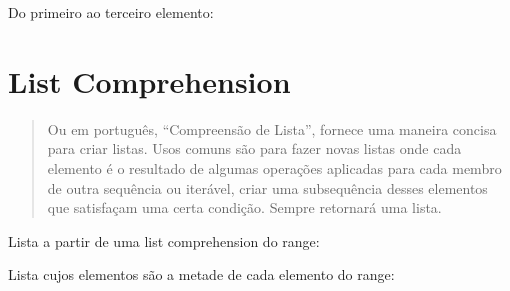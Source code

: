 \documentclass[letterpaper,10pt,brazil]{sphinxmanual}
\begin{document}
Do primeiro ao terceiro elemento:

\begin{sphinxVerbatim}[commandchars=\\\{\}]
\PYG{p}{[}\PYG{p}{]}
\end{sphinxVerbatim}

\begin{sphinxVerbatim}[commandchars=\\\{\}]
\end{sphinxVerbatim}


\section{List Comprehension}
\label{\detokenize{content/sequences:list-comprehension}}\begin{quote}

Ou em português, “Compreensão de Lista”, fornece uma maneira concisa para criar listas.
Usos comuns são para fazer novas listas onde cada elemento é o resultado de algumas operações aplicadas para cada membro de outra sequência ou iterável, criar uma subsequência desses elementos que satisfaçam uma certa condição.
Sempre retornará uma lista.
\end{quote}

Lista a partir de uma list comprehension do range:

\begin{sphinxVerbatim}[commandchars=\\\{\}]
\PYG{p}{[}    \PYG{p}{]}
\end{sphinxVerbatim}

\begin{sphinxVerbatim}[commandchars=\\\{\}]
\end{sphinxVerbatim}

Lista cujos elementos são a metade de cada elemento do range:

\begin{sphinxVerbatim}[commandchars=\\\{\}]
\PYG{p}{[}      \PYG{p}{]}
\end{sphinxVerbatim}
\end{document}
